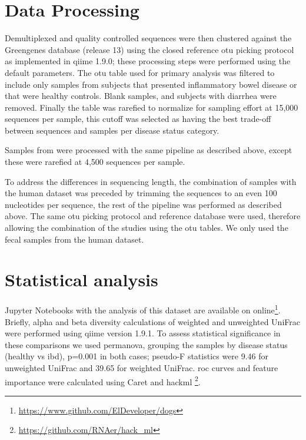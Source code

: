 \section{Data Processing}

Demultiplexed and quality controlled sequences were then clustered against the Greengenes \cite{RN165} database (release 13) using the closed reference \gls{otu} picking protocol \cite{RN166} as implemented in \gls{qiime} \cite{RN110} 1.9.0; these processing steps were performed using the default parameters. The \gls{otu} table used for primary analysis was filtered to include only samples from subjects that presented inflammatory bowel disease or that were healthy controls. Blank samples, and subjects with diarrhea were removed. Finally the table was rarefied to normalize for sampling effort \cite{RN167} at 15,000 sequences per sample, this cutoff was selected as having the best trade-off between sequences and samples per disease status category.

Samples from \cite{RN153} were processed with the same pipeline as described above, except these were rarefied at 4,500 sequences per sample.

To address the differences in sequencing length, the combination of samples with the human dataset \cite{RN154} was preceded by trimming the sequences to an even 100 nucleotides per sequence, the rest of the pipeline was performed as described above. The same \gls{otu} picking protocol and reference database were used, therefore allowing the combination of the studies using the \gls{otu} tables. We only used the fecal samples from the human dataset.

\section{Statistical analysis}

Jupyter Notebooks \cite{RN162} with the analysis of this dataset are available on online\footnote{\url{https://www.github.com/ElDeveloper/dogs}}. Briefly, alpha and beta diversity calculations of weighted and unweighted UniFrac \cite{RN133} were performed using \gls{qiime} version 1.9.1. To assess statistical significance in these comparisons we used \gls{permanova}, grouping the samples by disease status (healthy vs \gls{ibd}), p=0.001 in both cases; pseudo-F statistics were 9.46 for unweighted UniFrac and 39.65 for weighted UniFrac. \gls{roc} curves and feature importance were calculated using Caret \cite{RN3986} and hack\textunderscore ml \footnote{\url{https://github.com/RNAer/hack_ml}}.

